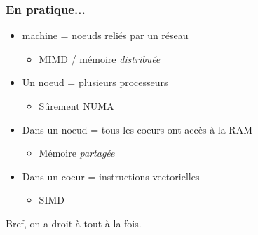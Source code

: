 \documentclass[xcolor={x11names,svgnames}]{beamer}
\begin{document}
\begin{frame}
  \frametitle{En pratique...}

  \begin{itemize}
  \item machine = noeuds reliés par un réseau
    \begin{itemize}
      \item MIMD / mémoire \emph{distribuée}
    \end{itemize}
    \medskip
  \item Un noeud = plusieurs processeurs
    \begin{itemize}
    \item Sûrement NUMA
    \end{itemize}
    \medskip
  \item Dans un noeud = tous les coeurs ont accès à la RAM
    \begin{itemize}
    \item Mémoire \emph{partagée}
    \end{itemize}
    \medskip
  \item Dans un coeur = instructions vectorielles
    \begin{itemize}
    \item SIMD
    \end{itemize}
  \end{itemize}

  \bigskip

  Bref, on a droit à tout à la fois.
\end{frame}

\end{document}
